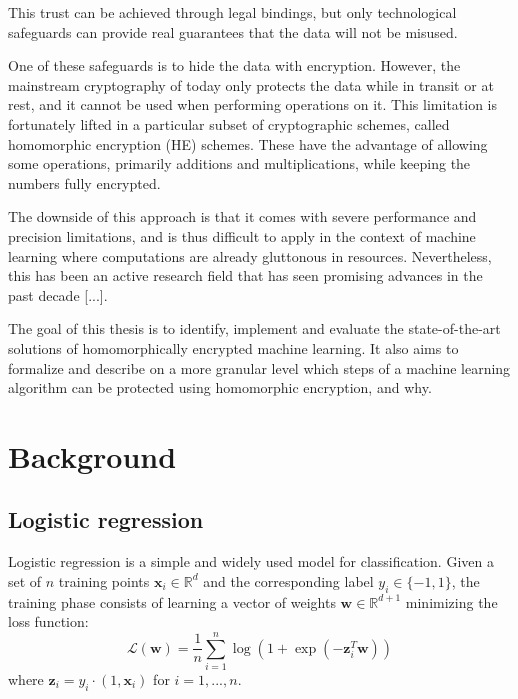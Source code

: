 \documentclass[a4paper,11pt,oneside]{report}
\begin{document}
This trust can be achieved through legal bindings, but only technological safeguards can provide real guarantees that the data will not be misused.

One of these safeguards is to hide the data with encryption. However, the mainstream cryptography of today only protects the data while in transit or at rest, and it cannot be used when performing operations on it. This limitation is fortunately lifted in a particular subset of cryptographic schemes, called homomorphic encryption (HE) schemes. These have the advantage of allowing some operations, primarily additions and multiplications, while keeping the numbers fully encrypted.

The downside of this approach is that it comes with severe performance and precision limitations, and is thus difficult to apply in the context of machine learning where computations are already gluttonous in resources. Nevertheless, this has been an active research field that has seen promising advances in the past decade [...].

The goal of this thesis is to identify, implement and evaluate the state-of-the-art solutions of homomorphically encrypted machine learning. It also aims to formalize and describe on a more granular level which steps of a machine learning algorithm can be protected using homomorphic encryption, and why.


\chapter{Background}



\section{Logistic regression}

Logistic regression is a simple and widely used model for classification. Given a set of $n$ training points $\mathbf{x}_i \in \mathbb{R}^d$ and the corresponding label $y_i \in \{-1,1\}$, the training phase consists of learning a vector of weights $\mathbf{w} \in \mathbb{R}^{d+1}$ minimizing the loss function:
\begin{equation}\label{eq:logistic_reg_train}
    \mathcal{L}(\mathbf{w}) = \frac{1}{n} \sum_{i=1}^{n} \log(1 + \exp(-\mathbf{z}_i^T \mathbf{w})) 
\end{equation}
where $\mathbf{z}_i = y_i \cdot (1, \mathbf{x}_i)$ for $i=1,...,n$.
\end{document}

